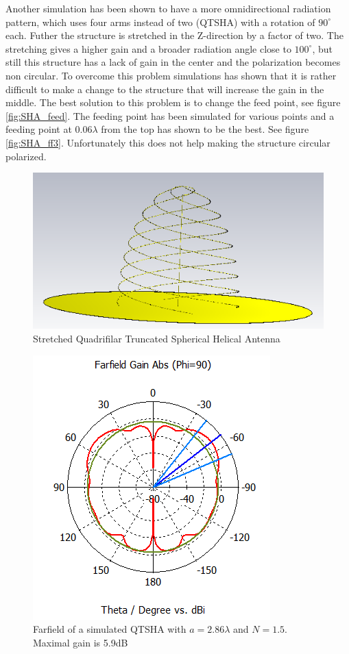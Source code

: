 Another simulation has been shown to have a more omnidirectional radiation pattern, which uses four arms instead of two (QTSHA) with a rotation of $90^\circ$ each. Futher the structure is stretched in the Z-direction by a factor of two. The stretching gives a higher gain and a broader radiation angle close to $100^\circ$, but still this structure has a lack of gain in the center and the polarization becomes non circular. To overcome this problem simulations has shown that it is rather difficult to make a change to the structure that will increase the gain in the middle. The best solution to this problem is to change the feed point, see figure \ref{fig:SHA_feed}. The feeding point has been simulated for various points and a feeding point at $0.06\lambda$ from the top has shown to be the best. See figure \ref{fig:SHA_ff3}. Unfortunately this does not help making the structure circular polarized.   

\begin{figure}[H]
\centering 
\includegraphics[scale = 0.7]{figures/antennas/hemispherical/hemispherical2}
\caption{Stretched Quadrifilar Truncated Spherical Helical Antenna}
\label{fig:SH32}
\end{figure} 

\begin{figure}[H]
\centering 
\includegraphics[scale = 0.7]{figures/antennas/hemispherical/hemispherical_farfield2}
\caption{Farfield of a simulated QTSHA with $a=2.86\lambda$ and $N=1.5$. Maximal gain is 5.9dB}
\label{fig:SHA_ff2}
\end{figure} 

